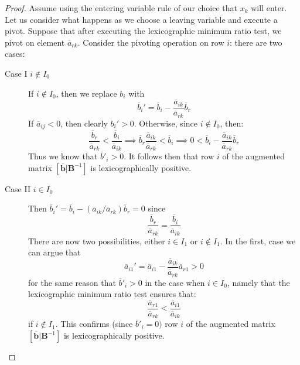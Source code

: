 \begin{proof}
Assume using the entering variable rule of our choice that $x_k$ will enter. Let us consider what happens as we choose a leaving variable and execute a pivot. Suppose that after executing the lexicographic minimum ratio test, we pivot on element $\overline{a}_{rk}$. Consider the pivoting operation on row $i$: there are two cases:

\begin{description}
\item [Case I $i \not \in I_0$] If $i \not\in I_0$, then we replace $b_i$ with 
\begin{displaymath}
\overline{b}_i' = \overline{b}_i - \frac{\overline{a}_{ik}}{\overline{a}_{rk}}\overline{b}_r
\end{displaymath}
If $\overline{a}_{ij} < 0$, then clearly $b_i' > 0$. Otherwise,
since $i \not\in I_0$, then:
\begin{displaymath}
\frac{\overline{b}_r}{\overline{a}_{rk}} < \frac{\overline{b}_i}{\overline{a}_{ik}} \implies \overline{b}_r\frac{\overline{a}_{ik}}{\overline{a}_{rk}} < \overline{b}_i \implies 0 < \overline{b}_i - \frac{\overline{a}_{ik}}{\overline{a}_{rk}}\overline{b}_r
\end{displaymath}
Thus we know that $\overline{b}'_i > 0$. It follows then that row $i$ of the augmented matrix $[\overline{\mathbf{b}} | \mathbf{B}^{-1}]$ is lexicographically positive.


\item [Case II $i \in I_0$] Then $\overline{b}_i' = \overline{b}_i - (\overline{a}_{ik}/\overline{a}_{rk})\overline{b}_r = 0$ since 
\begin{displaymath}
\frac{\overline{b}_r}{\overline{a}_{rk}} = \frac{\overline{b}_i}{\overline{a}_{ik}}
\end{displaymath}
There are now two possibilities, either $i \in I_1$ or $i \not \in I_1$. In the first, case we can argue that 
\begin{displaymath}
\overline{a}_{i1}' = \overline{a}_{i1} - \frac{\overline{a}_{ik}}{\overline{a}_{rk}}\overline{a}_{r1} > 0
\end{displaymath} 
for the same reason that $\overline{b}'_i > 0$ in the case when $i \in I_0$, namely that the lexicographic minimum ratio test ensures that:
\begin{displaymath}
\frac{\overline{a}_{r1}}{\overline{a}_{rk}} < \frac{\overline{a}_{i1}}{\overline{a}_{ik}}
\end{displaymath}
if $i \not\in I_1$. This confirms (since $\overline{b}'_i = 0)$ row $i$ of the augmented matrix $[\overline{\mathbf{b}} | \mathbf{B}^{-1}]$ is lexicographically positive.


\end{description}
\end{proof}

